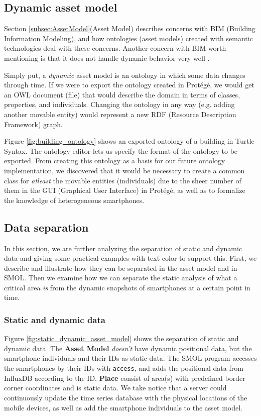 \documentclass{article}
\begin{document}
\subsection{Dynamic asset model}\label{subsubsec:DynamicAssetModel}
Section \ref{subsec:AssetModel}(Asset Model) describes concerns with BIM (Building Information Modeling), and how ontologies (asset models) created with semantic technologies deal with these concerns. Another concern with BIM worth mentioning is that it does not handle dynamic behavior very well \cite{kamburjan_digital_2022}.

Simply put, a \emph{dynamic} asset model is an ontology in which some data changes through time. If we were to export the ontology created in Protégé, we would get an OWL document (file) that would describe the domain in terms of classes, properties, and individuals. Changing the ontology in any way (e.g. adding another movable entity) would represent a new RDF (Resource Description Framework) graph.

Figure \ref{fig:building_ontology} shows an exported ontology of a building in Turtle Syntax. The ontology editor lets us specify the format of the ontology to be exported. From creating this ontology as a basis for our future ontology implementation, we discovered that it would be necessary to create a common class for \emph{atleast} the movable entities (individuals) due to the sheer number of them in the GUI (Graphical User Interface) in Protégé, as well as to formalize the knowledge of heterogeneous smartphones.

\subsection{Data separation}
In this section, we are further analyzing the separation of static and dynamic data and giving some practical examples with text color to support this. First, we describe and illustrate how they can be separated in the asset model and in SMOL. Then we examine how we can separate the static analysis of what a critical area \emph{is} from the dynamic snapshots of smartphones at a certain point in time.

\subsubsection{Static and dynamic data}\label{subsubsec:StaticAndDynamicData}
Figure \ref{fig:static_dynamic_asset_model} shows the separation of static and dynamic data. The \textbf{Asset Model} \emph{doesn't} have dynamic positional data, but the smartphone individuals and their IDs as static data. The SMOL program accesses the smartphones by their IDs with \verb|access|, and adds the positional data from InfluxDB according to the ID. \textbf{Place} consist of area(s) with predefined border corner coordinates and is static data. We take notice that a server could continuously update the time series database with the physical locations of the mobile devices, as well as add the smartphone individuals to the asset model.
\end{document}
